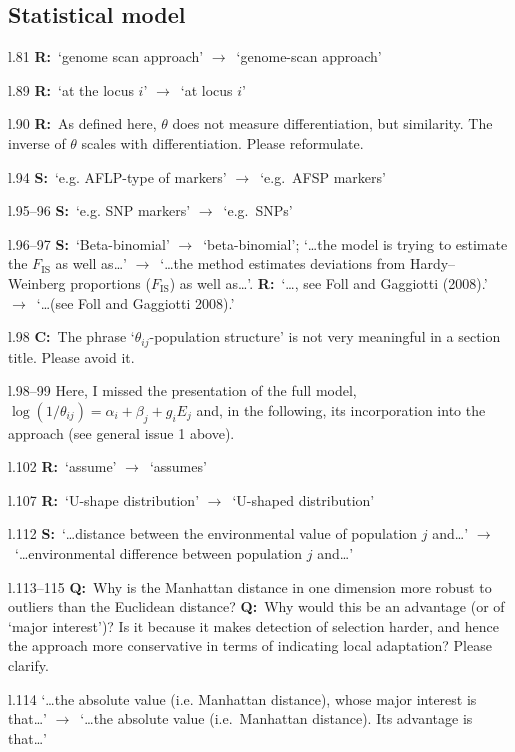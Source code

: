 \documentclass[11pt]{article}
\newenvironment{my_description}
{\begin{description}
  \setlength{\itemsep}{2pt}
  \setlength{\parskip}{0pt}
  \setlength{\parsep}{0pt}}
{\end{description}}
\newcommand{\ra}{$\rightarrow$\ }
\newcommand{\C}{\textbf{C:}\ }
\newcommand{\Q}{\textbf{Q:}\ }
\newcommand{\R}{\textbf{R:}\ }
\newcommand{\V}{\textbf{S:}\ }
\begin{document}
\subsection{Statistical model}

\begin{my_description}
	
	\item[l.81] \R `genome scan approach' \ra `genome-scan approach'
	\item[l.89] \R `at the locus $i$' \ra `at locus $i$'
	\item[l.90] \R As defined here, $\theta$ does not measure differentiation, but similarity. The inverse of $\theta$ scales with differentiation. Please reformulate.
	\item[l.94] \V `e.g. AFLP-type of markers' \ra `e.g.\ AFSP markers'
	\item[l.95--96] \V `e.g. SNP markers' \ra `e.g.\ SNPs'
	\item[l.96--97] \V `Beta-binomial' \ra `beta-binomial'; `\dots the model is trying to estimate the $F_{\mathrm{IS}}$ as well as\dots' \ra `\dots the method estimates deviations from Hardy--Weinberg proportions ($F_\mathrm{IS}$) as well as\dots'. \R `\dots, see Foll and Gaggiotti (2008).' \ra `\dots (see Foll and Gaggiotti 2008).'
	\item[l.98] \C The phrase `$\theta_{ij}$-population structure' is not very meaningful in a section title. Please avoid it.
	\item[l.98--99] Here, I missed the presentation of the full model, $\log(1/\theta_{ij}) = \alpha_{i} + \beta_{j} + g_{i} E_{j}$ and, in the following, its incorporation into the approach (see general issue 1 above).
	\item[l.102] \R `assume' \ra `assumes'
	\item[l.107] \R `U-shape distribution' \ra `U-shaped distribution'
	\item[l.112] \V `\dots distance between the environmental value of population $j$ and\dots' \ra `\dots environmental difference between population $j$ and\dots'
	\item[l.113--115] \Q Why is the Manhattan distance in one dimension more robust to outliers than the Euclidean distance? \Q Why would this be an advantage (or of `major interest')? Is it because it makes detection of selection harder, and hence the approach more conservative in terms of indicating local adaptation? Please clarify.
	\item[l.114] `\dots the absolute value (i.e. Manhattan distance), whose major interest is that\dots' \ra `\dots the absolute value (i.e.\ Manhattan distance). Its advantage is that\dots'

\end{my_description}
\end{document}
